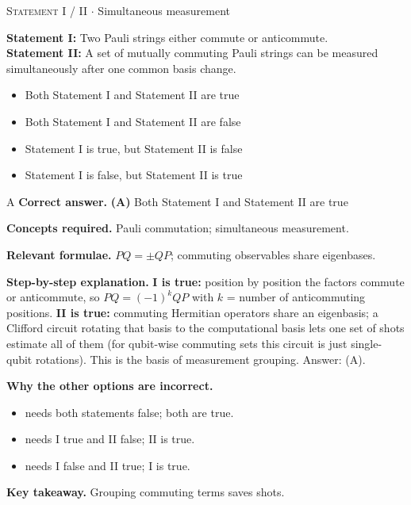 \documentclass[11pt,a4paper]{article}
\newcommand{\optlabel}[1]{\textbf{(#1)}}
\newcommand{\correctlabel}[1]{\textcolor{okgreen}{\textbf{(#1)}\,\ding{51}}}
\newenvironment{qitem}[1]{\begin{list}{}{\setlength{\leftmargin}{3.3em}\setlength{\labelwidth}{3.1em}%
  \setlength{\labelsep}{0.2em}\setlength{\topsep}{3pt}\setlength{\parsep}{3pt}}\item[\textbf{Q.#1}\hfill]}{\end{list}}
\newcommand{\qsep}{\par\vspace{2pt}{\color{black!15}\hrule}\vspace{4pt}}
\newcommand{\qmeta}[2]{{\footnotesize\color{black!60}\textsc{#1} \;$\cdot$\; #2}\par}
\begin{document}
\begin{qitem}{39}
\qmeta{Statement I / II}{Simultaneous measurement}
\textbf{Statement I:} Two Pauli strings either commute or anticommute.\\[1mm]
\textbf{Statement II:} A set of mutually commuting Pauli strings can be measured simultaneously after one common basis change.
\begin{itemize}[leftmargin=2.6em, labelsep=0.4em, itemsep=2pt, topsep=3pt]
\item[\correctlabel{A}] Both Statement I and Statement II are true
\item[\optlabel{B}] Both Statement I and Statement II are false
\item[\optlabel{C}] Statement I is true, but Statement II is false
\item[\optlabel{D}] Statement I is false, but Statement II is true
\end{itemize}
\end{qitem}
\begin{solbox}{A}
\textbf{\color{brand}Correct answer.} \textcolor{okgreen}{\textbf{(A)}} Both Statement I and Statement II are true

\textbf{\color{brand}Concepts required.} Pauli commutation; simultaneous measurement.

\textbf{\color{brand}Relevant formulae.} $PQ = \pm QP$; commuting observables share eigenbases.

\textbf{\color{brand}Step-by-step explanation.} \textbf{I is true:} position by position the factors commute or anticommute, so $PQ = (-1)^kQP$ with $k$ = number of anticommuting positions.
\textbf{II is true:} commuting Hermitian operators share an eigenbasis; a Clifford circuit rotating that basis to the computational basis lets
one set of shots estimate all of them (for qubit-wise commuting sets this circuit is just single-qubit rotations). This is the basis of
measurement grouping. Answer: (A).

\textbf{\color{brand}Why the other options are incorrect.}
\begin{itemize}[leftmargin=2.4em, itemsep=1pt, topsep=2pt]
\item[\textbf{(B)}] needs both statements false; both are true.
\item[\textbf{(C)}] needs I true and II false; II is true.
\item[\textbf{(D)}] needs I false and II true; I is true.
\end{itemize}
\textbf{\color{brand}Key takeaway.} Grouping commuting terms saves shots.
\end{solbox}
\qsep
\end{document}
